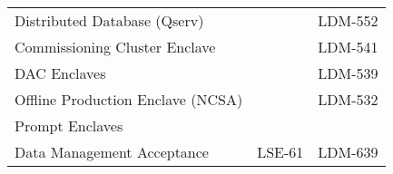 \begin{longtable}{p{}p{}p{}}
Distributed Database (Qserv)      &                              &   \cellcolor{dmblue} LDM-552 \\
Commissioning Cluster Enclave     &                              & \cellcolor{dmyellow} LDM-541 \\
DAC Enclaves                      &                              & \cellcolor{dmyellow} LDM-539 \\
Offline Production Enclave (NCSA) &                              & \cellcolor{dmyellow} LDM-532 \\
Prompt Enclaves                   &                              &                              \\
Data Management Acceptance        &    \cellcolor{dmblue} LSE-61 & \cellcolor{dmorange} LDM-639 \\
\bottomrule

\end{longtable}
